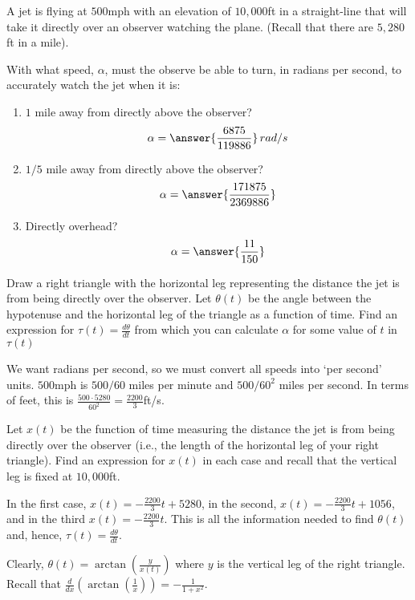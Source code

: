 \documentclass{ximera}
\author{Gregory Hartman \and Matthew Carr}
\begin{document}
\begin{exercise}



A jet is flying at $500$mph with an elevation of $10,000$ft in a straight-line that will take it directly over an observer watching the plane. (Recall that there are $5,280$ft in a mile).

With what speed, $\alpha$, must the observe be able to turn, in radians per second, to accurately watch the jet when it is:
\begin{enumerate}
\item		$1$ mile away from directly above the observer? \[\alpha=\answer{\frac{6875}{119886}}\,rad/s\]
\item		$1/5$ mile away from directly above the observer? \[\alpha=\answer{\frac{171875}{2369886}}\]
\item		Directly overhead? \[\alpha=\answer{\frac{11}{150}}\]
\end{enumerate}

\begin{hint}
Draw a right triangle with the horizontal leg representing the distance the jet is from being directly over the observer. Let $\theta(t)$ be the angle between the hypotenuse and the horizontal leg of the triangle as a function of time. Find an expression for $\tau(t)=\frac{d\theta}{dt}$ from which you can calculate $\alpha$ for some value of $t$ in $\tau(t)$
\end{hint}
\begin{hint}
We want radians per second, so we must convert all speeds into `per second' units. $500$mph is $500/{60}$ miles per minute and $500/{60^2}$ miles per second. In terms of feet, this is $\frac{500\cdot5280}{60^2}=\frac{2200}{3}$ft/s. 
\end{hint}
\begin{hint}
Let $x(t)$ be the function of time measuring the distance the jet is from being directly over the observer (i.e., the length of the horizontal leg of your right triangle). Find an expression for $x(t)$ in each case and recall that the vertical leg is fixed at $10,000$ft.
\end{hint}
\begin{hint}
In the first case, $x(t)=-\frac{2200}{3}t+5280$, in the second, $x(t)=-\frac{2200}{3}t+1056$, and in the third $x(t)=-\frac{2200}{3}t$. This is all the information needed to find $\theta(t)$ and, hence, $\tau(t)=\frac{d\theta}{dt}$.
\end{hint}
\begin{hint}
Clearly, $\theta(t)=\arctan(\frac{y}{x(t)})$ where $y$ is the vertical leg of the right triangle. Recall that $\frac{d}{dx}(\arctan(\frac{1}{x}))=-\frac{1}{1+x^2}$.


\end{hint}
\end{exercise}
\end{document}
